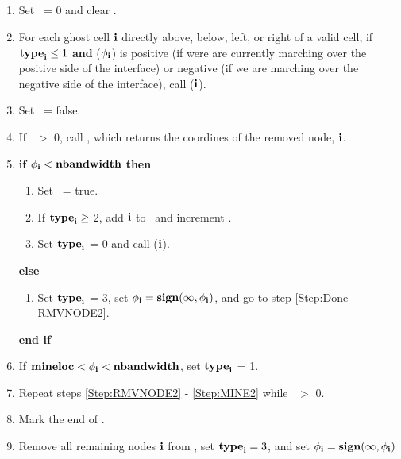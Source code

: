 \subsection{}
\begin{enumerate}
\item Set \numtent~= 0 and clear \heaploc.
\item For each ghost cell ${\bf i}$ directly above, below, left, or right of a valid cell, if ${\tt{\bf type}}_{{\bf i}} \le 1$  {\bf and} \sign($\phi_{\bf i}$) is positive (if were are currently marching over the positive side of the interface) or negative (if we are marching over the negative side of the interface), call (${\bf i}$).
\item Set \done~= false.
\item \label{Step:RMVNODE2} If \numtent~$>$ 0, call \RMVNODE, which returns the coordines of the removed node, ${\bf i}$.
\item {\bf if} $\phi_{\bf i} < {\tt{\bf nbandwidth}}$ {\bf then}
\begin{enumerate}
\item Set \done~= true.
\item If ${\tt{\bf type}}_{\bf i} \ge$ 2, add ${\bf i}$ to \nband~and increment \nbandnum.
\item Set ${\tt{\bf type}}_{\bf i}$ = 0 and call (${\bf i}$).
\end{enumerate}
{\bf else}
\begin{enumerate}
\item Set ${\tt{\bf type}}_{\bf i}$ = 3, set $\phi_{\bf i} = {\tt{\bf sign}}(\infty,\phi_{\bf i})$, and go to step \ref{Step:Done RMVNODE2}.
\end{enumerate}
{\bf end if}
\item \label{Step:MINE2} If ${\tt{\bf mineloc}} < \phi_{\bf i} < {\tt{\bf nbandwidth}}$, set ${\tt{\bf type}}_{\bf i}$ = 1.
\item Repeat steps \ref{Step:RMVNODE2} - \ref{Step:MINE2}  while \numtent~$>$ 0.
\item \label{Step:Done RMVNODE2} Mark the end of \nband.
\item Remove all remaining nodes ${\bf i}$ from \heap, set ${\tt{\bf type}}_{\bf i} = 3$, and set $\phi_{\bf i} = {\tt{\bf sign}}(\infty,\phi_{\bf i})$
\end{enumerate}

